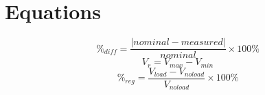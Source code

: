 \documentclass{article}
\begin{document}
%





\section{Equations}
\label{sec:equations}

%
\begin{equation}
  \label{eq:percent_diff}
  \%_{diff} = \frac{|nominal - measured|}{nominal}\times 100\%
\end{equation}
%
\begin{equation}
  \label{eq:ripple}
  V_r = V_{max} - V_{min}
\end{equation}
%
\begin{equation}
  \label{eq:volt_reg}
  \%_{reg} = \frac{V_{load} - V_{no load}}{V_{no load}}\times 100\%
\end{equation}
\end{document}
